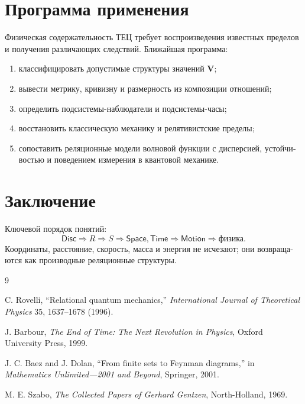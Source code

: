 \documentclass[11pt,a4paper]{article}
\theoremstyle{definition}
\theoremstyle{plain}
\theoremstyle{remark}
\newcommand{\Rel}{R}
\newcommand{\Vstruct}{\mathbf V}
\newcommand{\State}{S}
\newcommand{\Disc}{\mathsf{Disc}}
\newcommand{\Space}{\mathsf{Space}}
\newcommand{\Time}{\mathsf{Time}}
\newcommand{\Motion}{\mathsf{Motion}}
\begin{document}
\begin{russian}
\section{Программа применения}

Физическая содержательность ТЕЦ требует воспроизведения известных пределов и
получения различающих следствий. Ближайшая программа:
\begin{enumerate}[label=(\roman*)]
  \item классифицировать допустимые структуры значений \(\Vstruct\);
  \item вывести метрику, кривизну и размерность из композиции отношений;
  \item определить подсистемы-наблюдатели и подсистемы-часы;
  \item восстановить классическую механику и релятивистские пределы;
  \item сопоставить реляционные модели волновой функции с дисперсией,
        устойчивостью и поведением измерения в квантовой механике.
\end{enumerate}

\section{Заключение}

Ключевой порядок понятий:
\[
\Disc \Rightarrow \Rel \Rightarrow \State \Rightarrow \Space,\Time
\Rightarrow \Motion \Rightarrow \text{физика}.
\]
Координаты, расстояние, скорость, масса и энергия не исчезают; они возвращаются
как производные реляционные структуры.

\end{russian}

\begin{thebibliography}{9}

C. Rovelli,
``Relational quantum mechanics,''
\emph{International Journal of Theoretical Physics} 35, 1637--1678 (1996).

J. Barbour,
\emph{The End of Time: The Next Revolution in Physics},
Oxford University Press, 1999.

J. C. Baez and J. Dolan,
``From finite sets to Feynman diagrams,''
in \emph{Mathematics Unlimited---2001 and Beyond}, Springer, 2001.

M. E. Szabo,
\emph{The Collected Papers of Gerhard Gentzen},
North-Holland, 1969.

\end{thebibliography}
\end{document}
